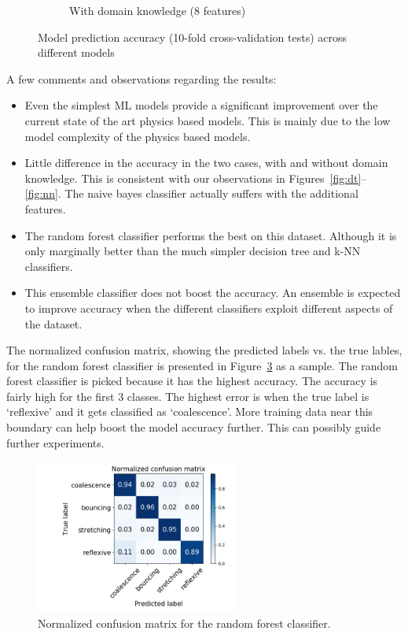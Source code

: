 \documentclass{article}
\begin{document}
\begin{figure}[h!]
\begin{subfigure}[b]{0.45\textwidth}
        \caption{With domain knowledge (8  features)}
        \label{fig:tiger}
    \end{subfigure}
    \caption{Model prediction accuracy (10-fold cross-validation tests) across different models}\label{fig:tuned}
\end{figure}


A few comments and observations regarding the results:
\begin{itemize}
\item Even the simplest ML models provide a significant improvement over the current state of the art physics based models. This is mainly due to the low model complexity of the physics based models.
\item Little difference in the accuracy in the two cases, with and without domain knowledge. This is consistent with our observations in Figures~\ref{fig:dt}--\ref{fig:nn}. The naive bayes classifier actually suffers with the additional features.
\item The random forest classifier performs the best on this dataset. Although it is only marginally better than the much simpler decision tree and k-NN classifiers.
\item This ensemble classifier does not boost the accuracy. An ensemble is expected to improve accuracy when the different classifiers exploit different aspects of the dataset.
\end{itemize}


The normalized confusion matrix, showing the predicted labels vs. the true lables, for the random forest classifier is presented in Figure~\ref{fig:conf} as a sample. The random forest classifier is picked because it has the highest accuracy. The accuracy is fairly high for the first 3 classes. The highest error is when the true label is `reflexive' and it gets classified as `coalescence'. More training data near this boundary can help boost the model accuracy further. This can possibly guide further experiments.
\begin{figure}[h]
	\centering
	\includegraphics[width=0.6\textwidth]{figures/conf_mat.png}
	\caption{Normalized confusion matrix for the random forest classifier.}
	\label{fig:conf}
\end{figure}
\end{document}
